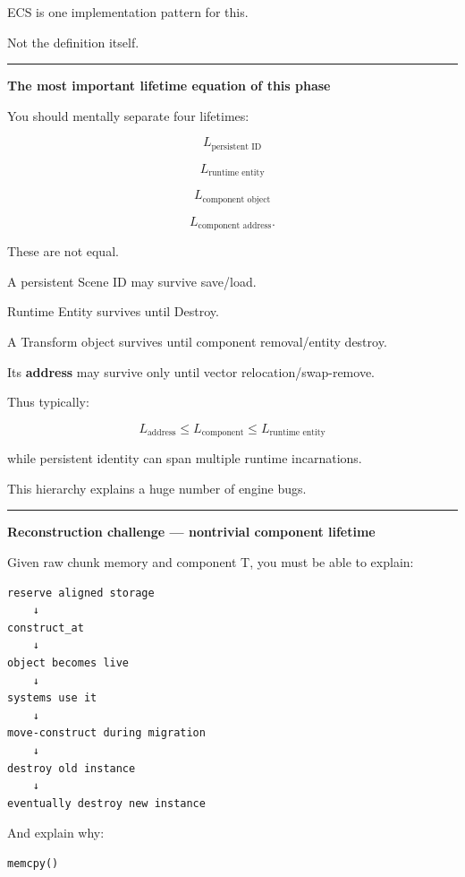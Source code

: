 ECS is one implementation pattern for this.

Not the definition itself.

\begin{center}\rule{0.5\linewidth}{0.5pt}\end{center}

\textbf{The most important lifetime equation of this phase}

You should mentally separate four lifetimes:

\[
L_{\text{persistent ID}}
\]

\[
L_{\text{runtime entity}}
\]

\[
L_{\text{component object}}
\]

\[
L_{\text{component address}}.
\]

These are not equal.

A persistent Scene ID may survive save/load.

Runtime Entity survives until Destroy.

A Transform object survives until component removal/entity destroy.

Its \textbf{address} may survive only until vector relocation/swap-remove.

Thus typically:

\[
L_{\text{address}}
\le
L_{\text{component}}
\le
L_{\text{runtime entity}}
\]

while persistent identity can span multiple runtime incarnations.

This hierarchy explains a huge number of engine bugs.

\begin{center}\rule{0.5\linewidth}{0.5pt}\end{center}

\textbf{Reconstruction challenge --- nontrivial component lifetime}

Given raw chunk memory and component T, you must be able to explain:

\begin{verbatim}
reserve aligned storage
    ↓
construct_at
    ↓
object becomes live
    ↓
systems use it
    ↓
move-construct during migration
    ↓
destroy old instance
    ↓
eventually destroy new instance
\end{verbatim}

And explain why:

\begin{verbatim}
memcpy()
\end{verbatim}

